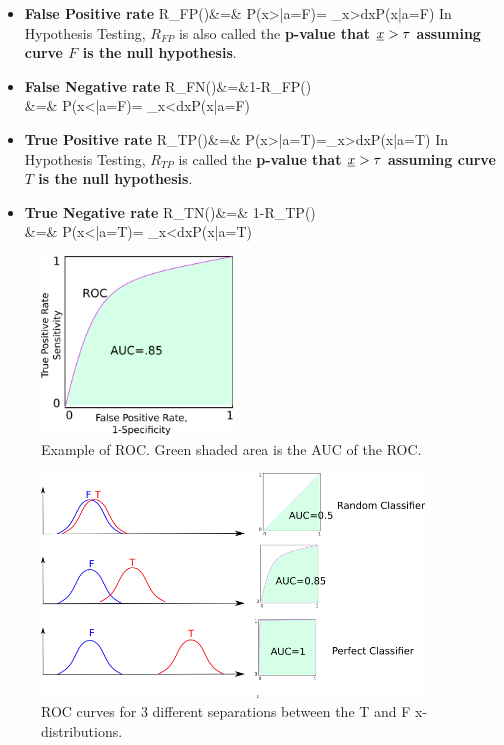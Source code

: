 \begin{itemize}
\item {\color{blue}\bf False Positive rate}
\beqa
\color{blue}
R_{FP}(\tau)&=&
P(x>\tau|a=F)= \int_{x>\tau}dx\;P(x|a=F)
\eeqa
In Hypothesis Testing,
$R_{FP}$ is also called the {\bf p-value that ${\underline{x}}>\tau$
assuming curve $F$ is the
null hypothesis}.

\item{\color{blue}\bf False Negative rate}
\beqa
\color{blue}
R_{FN}(\tau)&=&1-R_{FP}(\tau)
\\
&=&
 P(x<\tau|a=F)= \int_{x<\tau}dx\;P(x|a=F)
\eeqa

\item{\color{red}\bf True Positive  rate}
\beqa
\color{red}
R_{TP}(\tau)&=& 
P(x>\tau|a=T)=\int_{x>\tau}dx\;P(x|a=T)
\eeqa
In Hypothesis Testing,
$R_{TP}$ is called the {\bf p-value that ${\underline{x}}>\tau$
assuming curve $T$ is the
null hypothesis}.

\item {\color{red}\bf True Negative rate}
\beqa
\color{red}
R_{TN}(\tau)&=& 1-R_{TP}(\tau)
\\
&=& P(x<\tau|a=T)= \int_{x<\tau}dx\;P(x|a=T)
\eeqa
\end{itemize}

\begin{figure}[h!]
\centering
\includegraphics[width=2in]
{roc/roc-auc.png}
\caption{Example of ROC.
Green shaded
 area is the AUC of the ROC.} 
\label{fig-roc-auc}
\end{figure}

\begin{figure}[h!]
\centering
\includegraphics[width=4in]
{roc/roc-panels.png}
\caption{
ROC curves for
3 different separations
between the T and F 
x-distributions.} 
\label{fig-roc-panels}
\end{figure}



